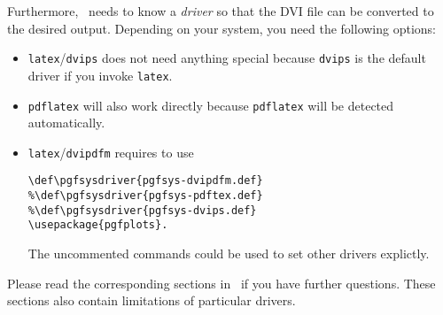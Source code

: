 Furthermore, \PGF\ needs to know a \emph{driver} so that the DVI file can be converted to the desired output. Depending on your system, you need the following options:
\begin{itemize}
	\item \lstinline!latex!/\lstinline!dvips! does not need anything special because \lstinline!dvips! is the default driver if you invoke \lstinline!latex!.
	\item \lstinline!pdflatex! will also work directly because \lstinline!pdflatex! will be detected automatically.
	\item \lstinline!latex!/\lstinline!dvipdfm! requires to use
\begin{lstlisting}
\def\pgfsysdriver{pgfsys-dvipdfm.def}
%\def\pgfsysdriver{pgfsys-pdftex.def}
%\def\pgfsysdriver{pgfsys-dvips.def}
\usepackage{pgfplots}.
\end{lstlisting}
	The uncommented commands could be used to set other drivers explictly.
\end{itemize}
Please read the corresponding sections in~\cite[Section 7.2.1 and 7.2.2]{tikz} if you have further questions. These sections also contain limitations of particular drivers.

